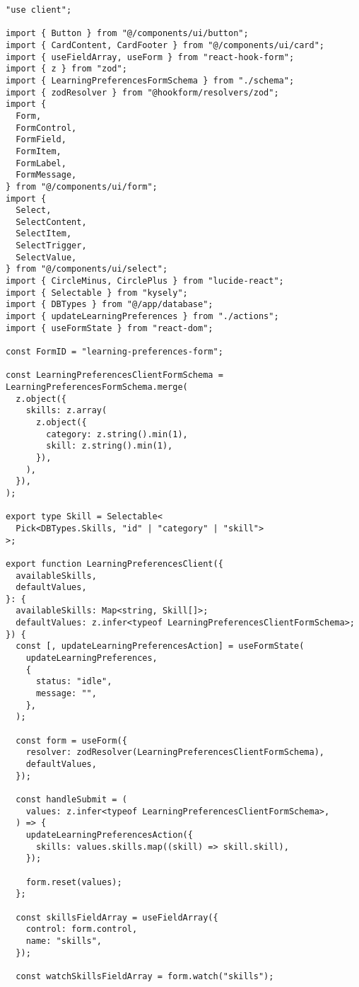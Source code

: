 \begin{verbatim}
"use client";

import { Button } from "@/components/ui/button";
import { CardContent, CardFooter } from "@/components/ui/card";
import { useFieldArray, useForm } from "react-hook-form";
import { z } from "zod";
import { LearningPreferencesFormSchema } from "./schema";
import { zodResolver } from "@hookform/resolvers/zod";
import {
  Form,
  FormControl,
  FormField,
  FormItem,
  FormLabel,
  FormMessage,
} from "@/components/ui/form";
import {
  Select,
  SelectContent,
  SelectItem,
  SelectTrigger,
  SelectValue,
} from "@/components/ui/select";
import { CircleMinus, CirclePlus } from "lucide-react";
import { Selectable } from "kysely";
import { DBTypes } from "@/app/database";
import { updateLearningPreferences } from "./actions";
import { useFormState } from "react-dom";

const FormID = "learning-preferences-form";

const LearningPreferencesClientFormSchema = LearningPreferencesFormSchema.merge(
  z.object({
    skills: z.array(
      z.object({
        category: z.string().min(1),
        skill: z.string().min(1),
      }),
    ),
  }),
);

export type Skill = Selectable<
  Pick<DBTypes.Skills, "id" | "category" | "skill">
>;

export function LearningPreferencesClient({
  availableSkills,
  defaultValues,
}: {
  availableSkills: Map<string, Skill[]>;
  defaultValues: z.infer<typeof LearningPreferencesClientFormSchema>;
}) {
  const [, updateLearningPreferencesAction] = useFormState(
    updateLearningPreferences,
    {
      status: "idle",
      message: "",
    },
  );

  const form = useForm({
    resolver: zodResolver(LearningPreferencesClientFormSchema),
    defaultValues,
  });

  const handleSubmit = (
    values: z.infer<typeof LearningPreferencesClientFormSchema>,
  ) => {
    updateLearningPreferencesAction({
      skills: values.skills.map((skill) => skill.skill),
    });

    form.reset(values);
  };

  const skillsFieldArray = useFieldArray({
    control: form.control,
    name: "skills",
  });

  const watchSkillsFieldArray = form.watch("skills");


\end{verbatim}
